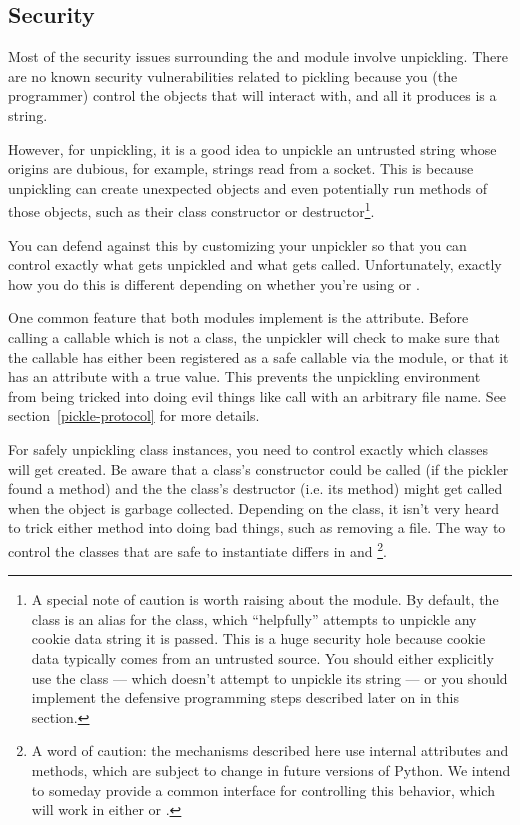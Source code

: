 \subsection{Security \label{pickle-sec}}

Most of the security issues surrounding the  and
 module involve unpickling.  There are no known
security vulnerabilities
related to pickling because you (the programmer) control the objects
that  will interact with, and all it produces is a
string.

However, for unpickling, it is  a good idea to unpickle
an untrusted string whose origins are dubious, for example, strings
read from a socket.  This is because unpickling can create unexpected
objects and even potentially run methods of those objects, such as
their class constructor or destructor\footnote{A special note of
caution is worth raising about the 
module.  By default, the  class is an alias for
the  class, which ``helpfully'' attempts to
unpickle any cookie data string it is passed.  This is a huge security
hole because cookie data typically comes from an untrusted source.
You should either explicitly use the  class
--- which doesn't attempt to unpickle its string --- or you should
implement the defensive programming steps described later on in this
section.}.

You can defend against this by customizing your unpickler so that you
can control exactly what gets unpickled and what gets called.
Unfortunately, exactly how you do this is different depending on
whether you're using  or .

One common feature that both modules implement is the
 attribute.  Before calling a callable
which is not a class, the unpickler will check to make sure that the
callable has either been registered as a safe callable via the
 module, or that it has an
attribute  with a true value.  This
prevents the unpickling environment from being tricked into doing
evil things like call  with an arbitrary file name.
See section~\ref{pickle-protocol} for more details.

For safely unpickling class instances, you need to control exactly
which classes will get created.  Be aware that a class's constructor
could be called (if the pickler found a 
method) and the the class's destructor (i.e. its  method)
might get called when the object is garbage collected.  Depending on
the class, it isn't very heard to trick either method into doing bad
things, such as removing a file.  The way to
control the classes that are safe to instantiate differs in
 and \footnote{A word of caution: the
mechanisms described here use internal attributes and methods, which
are subject to change in future versions of Python.  We intend to
someday provide a common interface for controlling this behavior,
which will work in either  or .}.


